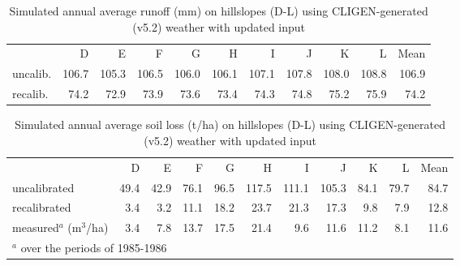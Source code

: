 \begin{table}[htbp]
  \centering
  \caption[Simulated annual average runoff on hillslopes using
CLIGEN-generated weather with updated input]{Simulated annual average runoff
(mm) on hillslopes (D-L) using CLIGEN-generated (v5.2) weather with updated
input}
  \label{tab:SimulatedRunoffWithCLIGENV52WithUpdatedInput}
  \small
    \begin{tabular}{lrrrrrrrrrr}
      \toprule
      & D & E & F & G & H & I & J & K & L & Mean\\
      \cmidrule{2-11}
      uncalib. & 106.7 & 105.3 & 106.5 & 106.0 & 106.1 & 107.1
& 107.8 & 108.0 & 108.8 & 106.9\\
      recalib. & 74.2 & 72.9 & 73.9 & 73.6 & 73.4 & 74.3 &
74.8 & 75.2 & 75.9 & 74.2\\
      \bottomrule
    \end{tabular}
\end{table}

\begin{table}[htbp]
  \centering
  \caption[Simulated annual average soil loss on hillslopes using
CLIGEN-generated weather with updated input]{Simulated annual average soil loss
(t/ha) on hillslopes (D-L) using CLIGEN-generated (v5.2) weather with updated
input}
  \label{tab:SimulatedSoilLossWithCLIGENV52WithUpdatedInput}
  \footnotesize
    \begin{tabular}{lrrrrrrrrrr}
      \toprule
      & D & E & F & G & H & I & J & K & L & Mean\\
      \cmidrule{2-11}
      uncalibrated & 49.4 & 42.9 & 76.1 & 96.5 & 117.5 & 111.1
& 105.3 & 84.1 & 79.7 & 84.7\\
      recalibrated & 3.4 & 3.2 & 11.1 & 18.2 & 23.7 & 21.3 &
17.3 & 9.8 & 7.9 & 12.8\\
      measured$^a$ (m$^3$/ha) & 3.4 & 7.8 & 13.7 & 17.5 & 21.4
& 9.6 & 11.6 & 11.2 & 8.1 & 11.6\\
      \bottomrule
      \multicolumn{8}{l}{\footnotesize $^a$ over the periods
of 1985-1986 \citep[From][]{favis-mortlock1998-141}}
    \end{tabular}
\end{table}

